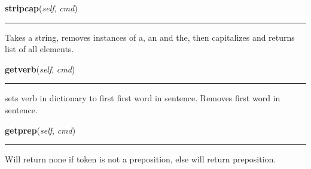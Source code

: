     \label{Lib:mudParser:mudparse:stripcap}

    \vspace{0.5ex}

    \begin{boxedminipage}{\textwidth}

    \raggedright \textbf{stripcap}(\textit{self}, \textit{cmd})

    \vspace{-1.5ex}

    \rule{\textwidth}{0.5\fboxrule}
    Takes a string, removes instances of a, an and the, then capitalizes 
    and returns list of all elements.

    \vspace{1ex}

    \end{boxedminipage}

    \label{Lib:mudParser:mudparse:getverb}

    \vspace{0.5ex}

    \begin{boxedminipage}{\textwidth}

    \raggedright \textbf{getverb}(\textit{self}, \textit{cmd})

    \vspace{-1.5ex}

    \rule{\textwidth}{0.5\fboxrule}
    sets verb in dictionary to first first word in sentence. Removes first 
    word in sentence.

    \vspace{1ex}

    \end{boxedminipage}

    \label{Lib:mudParser:mudparse:getprep}

    \vspace{0.5ex}

    \begin{boxedminipage}{\textwidth}

    \raggedright \textbf{getprep}(\textit{self}, \textit{cmd})

    \vspace{-1.5ex}

    \rule{\textwidth}{0.5\fboxrule}
    Will return none if token is not a preposition, else will return 
    preposition.

    \vspace{1ex}

    \end{boxedminipage}

